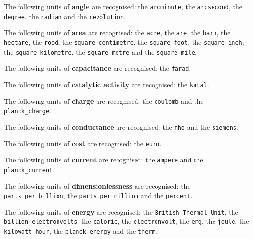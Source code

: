 \noindent The following units of {\bf angle} are recognised:\newline
\noindent the {\tt arcminute}, the {\tt arcsecond}, the {\tt degree}, the {\tt radian} and the {\tt revolution}.\vspace{5mm}

\noindent The following units of {\bf area} are recognised:\newline
\noindent the {\tt acre}, the {\tt are}, the {\tt barn}, the {\tt hectare}, the {\tt rood}, the {\tt square\_\-centimetre}, the {\tt square\_\-foot}, the {\tt square\_\-inch}, the {\tt square\_\-kilometre}, the {\tt square\_\-metre} and the {\tt square\_\-mile}.\vspace{5mm}

\noindent The following units of {\bf capacitance} are recognised:\newline
\noindent the {\tt farad}.\vspace{5mm}

\noindent The following units of {\bf catalytic activity} are recognised:\newline
\noindent the {\tt katal}.\vspace{5mm}

\noindent The following units of {\bf charge} are recognised:\newline
\noindent the {\tt coulomb} and the {\tt planck\_\-charge}.\vspace{5mm}

\noindent The following units of {\bf conductance} are recognised:\newline
\noindent the {\tt mho} and the {\tt siemens}.\vspace{5mm}

\noindent The following units of {\bf cost} are recognised:\newline
\noindent the {\tt euro}.\vspace{5mm}

\noindent The following units of {\bf current} are recognised:\newline
\noindent the {\tt ampere} and the {\tt planck\_\-current}.\vspace{5mm}

\noindent The following units of {\bf dimensionlessness} are recognised:\newline
\noindent the {\tt parts\_\-per\_\-billion}, the {\tt parts\_\-per\_\-million} and the {\tt percent}.\vspace{5mm}

\noindent The following units of {\bf energy} are recognised:\newline
\noindent the {\tt British Thermal Unit}, the {\tt billion\_\-electronvolts}, the {\tt calorie}, the {\tt electronvolt}, the {\tt erg}, the {\tt joule}, the {\tt kilowatt\_\-hour}, the {\tt planck\_\-energy} and the {\tt therm}.\vspace{5mm}

